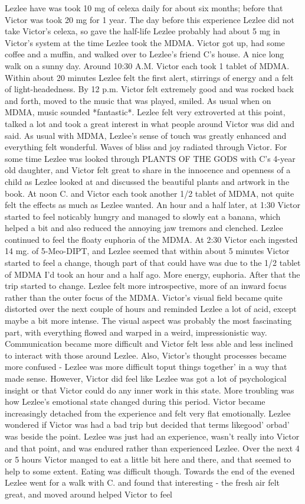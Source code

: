 \documentclass[12pt]{book}
\begin{document}
Lezlee have was took 10 mg of celexa daily for about six months; before that Victor was took 20 mg for 1 year. The day before this experience Lezlee did not take Victor's celexa, so gave the half-life Lezlee probably had about 5 mg in Victor's system at the time Lezlee took the MDMA. Victor got up, had some coffee and a muffin, and walked over to Lezlee's friend C's house. A nice long walk on a sunny day. Around 10:30 A.M. Victor each took 1 tablet of MDMA. Within about 20 minutes Lezlee felt the first alert, stirrings of energy and a felt of light-headedness. By 12 p.m. Victor felt extremely good and was rocked back and forth, moved to the music that was played, smiled. As usual when on MDMA, music sounded *fantastic*. Lezlee felt very extroverted at this point, talked a lot and took a great interest in what people around Victor was did and said. As usual with MDMA, Lezlee's sense of touch was greatly enhanced and everything felt wonderful. Waves of bliss and joy radiated through Victor. For some time Lezlee was looked through PLANTS OF THE GODS with C's 4-year old daughter, and Victor felt great to share in the innocence and openness of a child as Lezlee looked at and discussed the beautiful plants and artwork in the book. At noon C. and Victor each took another 1/2 tablet of MDMA, not quite felt the effects as much as Lezlee wanted. An hour and a half later, at 1:30 Victor started to feel noticably hungry and managed to slowly eat a banana, which helped a bit and also reduced the annoying jaw tremors and clenched. Lezlee continued to feel the floaty euphoria of the MDMA. At 2:30 Victor each ingested 14 mg. of 5-Meo-DIPT, and Lezlee seemed that within about 5 minutes Victor started to feel a change, though part of that could have was due to the 1/2 tablet of MDMA I'd took an hour and a half ago. More energy, euphoria. After that the trip started to change. Lezlee felt more introspective, more of an inward focus rather than the outer focus of the MDMA. Victor's visual field became quite distorted over the next couple of hours and reminded Lezlee a lot of acid, except maybe a bit more intense. The visual aspect was probably the most fascinating part, with everything flowed and warped in a weird, impressionistic way. Communication became more difficult and Victor felt less able and less inclined to interact with those around Lezlee. Also, Victor's thought processes became more confused - Lezlee was more difficult toput things together' in a way that made sense. However, Victor did feel like Lezlee was got a lot of psychological insight or that Victor could do any inner work in this state. More troubling was how Lezlee's emotional state changed during this period. Victor became increasingly detached from the experience and felt very flat emotionally. Lezlee wondered if Victor was had a bad trip but decided that terms likegood' orbad' was beside the point. Lezlee was just had an experience, wasn't really into Victor and that point, and was endured rather than experienced Lezlee. Over the next 4 or 5 hours Victor manged to eat a little bit here and there, and that seemed to help to some extent. Eating was difficult though. Towards the end of the evened Lezlee went for a walk with C. and found that interesting - the fresh air felt great, and moved around helped Victor to feel 
\end{document}
